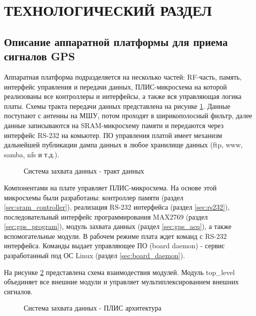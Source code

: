 \section{ТЕХНОЛОГИЧЕСКИЙ РАЗДЕЛ}

\subsection{Описание аппаратной платформы для приема сигналов GPS}
Аппаратная платформа подразделяется на несколько частей: RF-часть, память, интерфейс управления и передачи данных, ПЛИС-микросхема
на которой реализованы все контроллеры и интерфейсы, а также вся управляющая логика платы. Схемы тракта передачи данных
представлена на рисунке \ref{pic:board_scheme}. Данные поступают с антенны на МШУ, потом проходят в ширикополосный фильтр, далее
данные записываются на SRAM-микросхему памяти и передаются через интерфейс RS-232 на комьютер. ПО управления платой имеет механизм
дальнейшей публикации дампа данных в любое хранилище данных (ftp, www, samba, nfs и т.д.). 

\begin{figure}[H]
\caption{Система захвата данных - тракт данных}
\label{pic:board_scheme}
\end{figure}

Компонентами на плате управляет ПЛИС-микросхема. На основе этой микросхемы были разработаны: контроллер памяти (раздел \ref{sec:sram_controller}), реализация RS-232
интерфейса (раздел \ref{sec:rs232}), последовательный интерфейс программирования MAX2769 (раздел \ref{sec:gps_program}), модуль захвата данных
(раздел \ref{sec:gps_acq}), а также вспомогательные модули. В рабочем режиме плата ждет команд с RS-232 интерфейса. Команды выдает
управляющее ПО (board daemon) - сервис разработанный под ОС Linux (раздел \ref{sec:board_daemon}). 

На рисунке \ref{pic:fpga_scheme} представлена схема взаимодествия модулей. Модуль top\_level объединяет все внешние модули и 
управляет мультиплексированием внешних сигналов.

\begin{figure}[H]
\begin{center}
\end{center}
\caption{Система захвата данных - ПЛИС архитектура}
\label{pic:fpga_scheme}
\end{figure}

